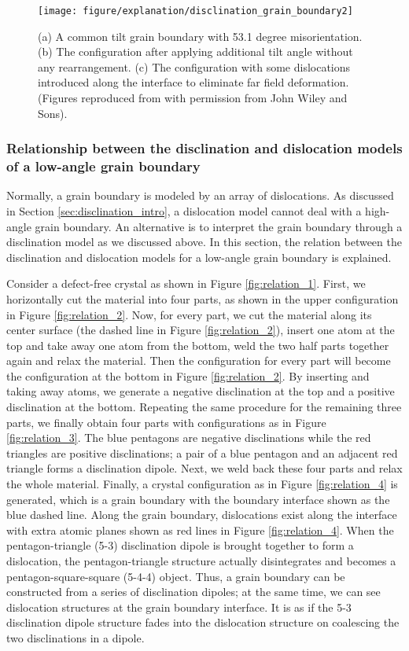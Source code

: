 \documentclass[11pt,letterpaper]{article}
\begin{document}
\begin {figure}
\centering
\texttt{[image: figure/explanation/disclination\_grain\_boundary2]}
\caption{(a) A common tilt grain boundary with 53.1 degree misorientation. (b) The configuration after applying additional tilt angle without any rearrangement. (c) The configuration with some dislocations introduced along the interface to eliminate far field deformation. (Figures reproduced from \cite{balluffi2005kinetics} with permission from John Wiley and Sons).}
\label{fig:grain_boundary3}
\end {figure}

\subsubsection{Relationship between the disclination and dislocation models of a low-angle grain boundary} \label{sec:relation_disclination_dislocation}

Normally, a grain boundary is modeled by an array of dislocations. As discussed in Section \ref{sec:disclination_intro}, a dislocation model cannot deal with a high-angle grain boundary. An alternative is to interpret the grain boundary through a disclination model as we discussed above. In this section, the relation between the disclination and dislocation models for a low-angle grain boundary is explained. 

Consider a defect-free crystal as shown in Figure \ref{fig:relation_1}. First, we horizontally cut the material into four parts, as shown in the upper configuration in Figure \ref{fig:relation_2}. Now, for every part, we cut the material along its center surface (the dashed line in Figure \ref{fig:relation_2}), insert one atom at the top and take away one atom from the bottom, weld the two half parts together again and relax the material. Then the configuration for every part will become the configuration at the bottom in Figure \ref{fig:relation_2}. By inserting and taking away atoms, we generate a negative disclination at the top and a positive disclination at the bottom. Repeating the same procedure for the remaining three parts, we finally obtain four parts with configurations as in Figure \ref{fig:relation_3}. The blue pentagons are negative disclinations while the red triangles are positive disclinations; a pair of a blue pentagon and an adjacent red triangle forms a disclination dipole. Next, we weld back these four parts and relax the whole material. Finally, a crystal configuration as in Figure \ref{fig:relation_4} is generated, which is a grain boundary with the boundary interface shown as the blue dashed line. Along the grain boundary, dislocations exist along the interface with extra atomic planes shown as red lines in Figure \ref{fig:relation_4}. When the pentagon-triangle (5-3) disclination dipole is brought together to form a dislocation, the pentagon-triangle structure actually disintegrates and becomes a pentagon-square-square (5-4-4) object. Thus, a grain boundary can be constructed from a series of disclination dipoles; at the same time, we can see dislocation structures at the grain boundary interface. It is as if the 5-3 disclination dipole structure fades into the dislocation structure on coalescing the two disclinations in a dipole.
\end{document}
